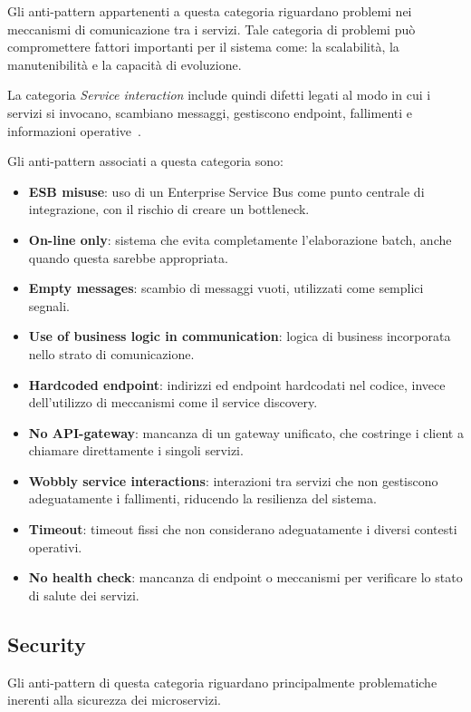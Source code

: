 Gli anti-pattern appartenenti a questa categoria riguardano problemi nei meccanismi di comunicazione tra i servizi. Tale categoria di problemi può compromettere fattori importanti per il sistema come: la scalabilità, la manutenibilità e la capacità di evoluzione.

La categoria \textit{Service interaction} include quindi difetti legati al modo in cui i servizi si invocano, scambiano messaggi, gestiscono endpoint, fallimenti e informazioni operative~\cite{CernyCatalogo}.

Gli anti-pattern associati a questa categoria sono:
\begin{itemize}
  \item \textbf{ESB misuse}: uso di un Enterprise Service Bus come punto centrale di integrazione, con il rischio di creare un bottleneck.
  \item \textbf{On-line only}: sistema che evita completamente l’elaborazione batch, anche quando questa sarebbe appropriata.
  \item \textbf{Empty messages}: scambio di messaggi vuoti, utilizzati come semplici segnali.
  \item \textbf{Use of business logic in communication}: logica di business incorporata nello strato di comunicazione.
  \item \textbf{Hardcoded endpoint}: indirizzi ed endpoint hardcodati nel codice, invece dell’utilizzo di meccanismi come il service discovery.
  \item \textbf{No API-gateway}: mancanza di un gateway unificato, che costringe i client a chiamare direttamente i singoli servizi.
  \item \textbf{Wobbly service interactions}: interazioni tra servizi che non gestiscono adeguatamente i fallimenti, riducendo la resilienza del sistema.
  \item \textbf{Timeout}: timeout fissi che non considerano adeguatamente i diversi contesti operativi.
  \item \textbf{No health check}: mancanza di endpoint o meccanismi per verificare lo stato di salute dei servizi.
\end{itemize}

\subsection{Security}

Gli anti-pattern di questa categoria riguardano principalmente problematiche inerenti alla sicurezza dei microservizi.

